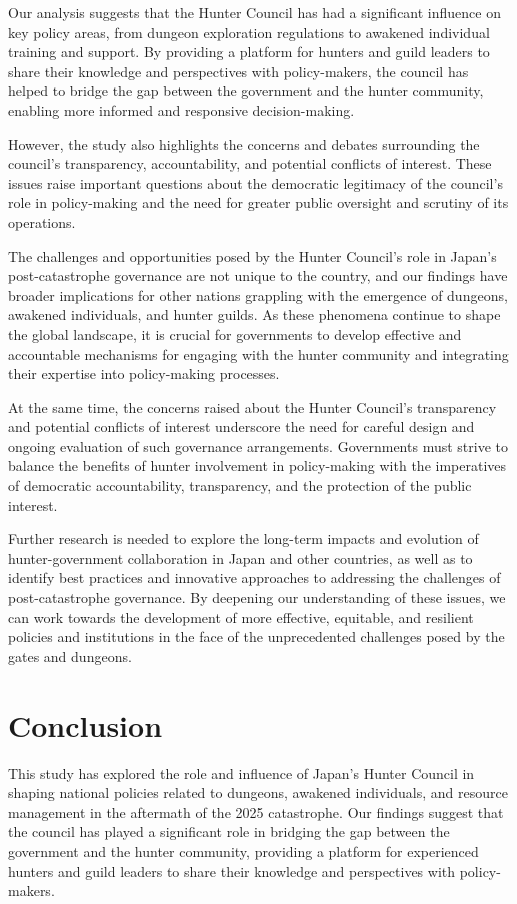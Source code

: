 \documentclass[12pt, a4paper]{article}
\begin{document}
Our analysis suggests that the Hunter Council has had a significant influence on key policy areas, from dungeon exploration regulations to awakened individual training and support. By providing a platform for hunters and guild leaders to share their knowledge and perspectives with policy-makers, the council has helped to bridge the gap between the government and the hunter community, enabling more informed and responsive decision-making.

However, the study also highlights the concerns and debates surrounding the council's transparency, accountability, and potential conflicts of interest. These issues raise important questions about the democratic legitimacy of the council's role in policy-making and the need for greater public oversight and scrutiny of its operations.

The challenges and opportunities posed by the Hunter Council's role in Japan's post-catastrophe governance are not unique to the country, and our findings have broader implications for other nations grappling with the emergence of dungeons, awakened individuals, and hunter guilds. As these phenomena continue to shape the global landscape, it is crucial for governments to develop effective and accountable mechanisms for engaging with the hunter community and integrating their expertise into policy-making processes.

At the same time, the concerns raised about the Hunter Council's transparency and potential conflicts of interest underscore the need for careful design and ongoing evaluation of such governance arrangements. Governments must strive to balance the benefits of hunter involvement in policy-making with the imperatives of democratic accountability, transparency, and the protection of the public interest.

Further research is needed to explore the long-term impacts and evolution of hunter-government collaboration in Japan and other countries, as well as to identify best practices and innovative approaches to addressing the challenges of post-catastrophe governance. By deepening our understanding of these issues, we can work towards the development of more effective, equitable, and resilient policies and institutions in the face of the unprecedented challenges posed by the gates and dungeons.

\section{Conclusion}
This study has explored the role and influence of Japan's Hunter Council in shaping national policies related to dungeons, awakened individuals, and resource management in the aftermath of the 2025 catastrophe. Our findings suggest that the council has played a significant role in bridging the gap between the government and the hunter community, providing a platform for experienced hunters and guild leaders to share their knowledge and perspectives with policy-makers.
\end{document}
